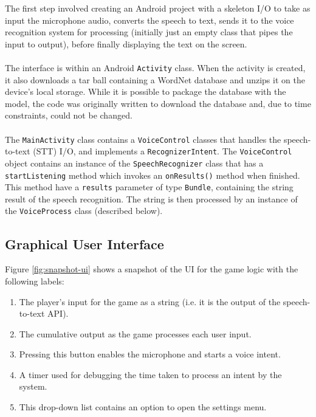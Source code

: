 \documentclass[12pt]{article}
\begin{document}
The first step involved creating an Android project with a skeleton I/O to take as input the microphone audio, converts the speech to text, sends it to the voice recognition system for processing (initially just an empty class that pipes the input to output), before finally displaying the text on the screen.
\\
\\
The interface is within an Android \texttt{Activity} class. When the activity is created, it also downloads a tar ball containing a WordNet database and unzips it on the device's local storage. While it is possible to package the database with the model, the code was originally written to download the database and, due to time constraints, could not be changed.
\\
\\
The \texttt{MainActivity} class contains a \texttt{VoiceControl} classes that  handles the speech-to-text (STT) I/O, and implements a \texttt{RecognizerIntent}. The \texttt{VoiceControl} object contains an instance of the \texttt{SpeechRecognizer} class that has a \texttt{startListening} method which invokes an \texttt{onResults()} method when finished. This method have a \texttt{results} parameter of type \texttt{Bundle}, containing the string result of the speech recognition. The string is then processed by an instance of the \texttt{VoiceProcess} class (described below).

\subsection{Graphical User Interface}

Figure \ref{fig:snapshot-ui} shows a snapshot of the UI for the game logic with the following labels:

\begin{enumerate}
	\item The player's input for the game as a string (i.e. it is the output of the speech-to-text API).
	\item The cumulative output as the game processes each user input.
	\item Pressing this button enables the microphone and starts a voice intent.
	\item A timer used for debugging the time taken to process an intent by the system.
	\item This drop-down list contains an option to open the settings menu.
\end{enumerate}
\end{document}
